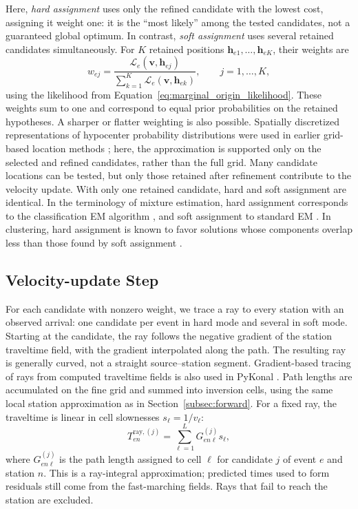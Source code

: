 \documentclass[12pt, a4paper]{article}
\begin{document}
Here, \emph{hard assignment} uses only the refined candidate with the lowest cost, assigning it weight one: it is the ``most likely'' among the tested candidates, not a guaranteed global optimum. In contrast, \emph{soft assignment} uses several retained candidates simultaneously. For $K$ retained positions $\mathbf h_{e1},\ldots,\mathbf h_{eK}$, their weights are
\begin{equation}
w_{ej}=\frac{\mathcal L_e(\mathbf v,\mathbf h_{ej})}
{\sum_{k=1}^{K}\mathcal L_e(\mathbf v,\mathbf h_{ek})},
\qquad j=1,\ldots,K,
\label{eq:location_weights}
\end{equation}
using the likelihood from Equation~\ref{eq:marginal_origin_likelihood}. These weights sum to one and correspond to equal prior probabilities on the retained hypotheses. A sharper or flatter weighting is also possible. Spatially discretized representations of hypocenter probability distributions were used in earlier grid-based location methods \parencite{wittlinger1993,lomax2000}; here, the approximation is supported only on the selected and refined candidates, rather than the full grid. Many candidate locations can be tested, but only those retained after refinement contribute to the velocity update. With only one retained candidate, hard and soft assignment are identical. In the terminology of mixture estimation, hard assignment corresponds to the classification EM algorithm \parencite{celeux1992}, and soft assignment to standard EM \parencite{dempster1977}. In clustering, hard assignment is known to favor solutions whose components overlap less than those found by soft assignment \parencite{kearns1997}.

\subsection{Velocity-update Step}
\label{subsec:mstep}

For each candidate with nonzero weight, we trace a ray to every station with an observed arrival: one candidate per event in hard mode and several in soft mode. Starting at the candidate, the ray follows the negative gradient of the station traveltime field, with the gradient interpolated along the path. The resulting ray is generally curved, not a straight source--station segment. Gradient-based tracing of rays from computed traveltime fields is also used in PyKonal \parencite{white2020pykonal}. Path lengths are accumulated on the fine grid and summed into inversion cells, using the same local station approximation as in Section~\ref{subsec:forward}. For a fixed ray, the traveltime is linear in cell slownesses $s_\ell=1/v_\ell$:
\begin{equation}
T_{en}^{\mathrm{ray},(j)}=\sum_{\ell=1}^{L}G_{en\ell}^{(j)}s_\ell,
\label{eq:fixed_ray_time}
\end{equation}
where $G_{en\ell}^{(j)}$ is the path length assigned to cell $\ell$ for candidate $j$ of event $e$ and station $n$. This is a ray-integral approximation; predicted times used to form residuals still come from the fast-marching fields. Rays that fail to reach the station are excluded.
\end{document}
